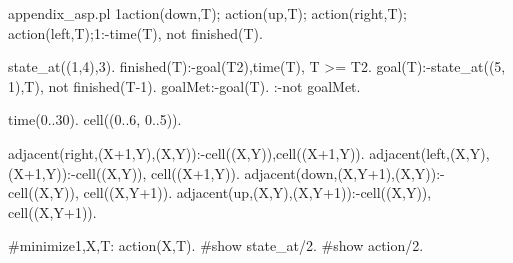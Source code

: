 \begin{filecontents*}{appendix_asp.pl}
1{action(down,T);
  action(up,T);
  action(right,T);
  action(left,T);}1:-time(T), not finished(T).

state_at((1,4),3).
finished(T):-goal(T2),time(T), T >= T2.
goal(T):-state_at((5, 1),T), not finished(T-1).
goalMet:-goal(T).
:-not goalMet.

time(0..30).
cell((0..6, 0..5)).

adjacent(right,(X+1,Y),(X,Y)):-cell((X,Y)),cell((X+1,Y)).
adjacent(left,(X,Y),(X+1,Y)):-cell((X,Y)), cell((X+1,Y)).
adjacent(down,(X,Y+1),(X,Y)):-cell((X,Y)), cell((X,Y+1)).
adjacent(up,(X,Y),(X,Y+1)):-cell((X,Y)), cell((X,Y+1)).

#minimize{1,X,T: action(X,T)}.
#show state_at/2.
#show action/2.
\end{filecontents*}